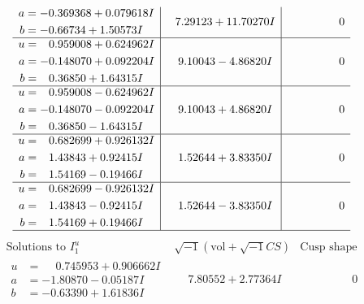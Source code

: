 \documentclass[1p]{elsarticle_modified}
\theoremstyle{definition}
\newcommand{\I}{\sqrt{-1}}
\begin{document}
$$\begin{array}{c|c|c}
\begin{aligned}
a &= -0.369368 + 0.079618 I \\
b &= -0.66734 + 1.50573 I\end{aligned}
 & \phantom{-}7.29123 + 11.70270 I & \phantom{-0.000000 } 0 \\ \hline\begin{aligned}
u &= \phantom{-}0.959008 + 0.624962 I \\
a &= -0.148070 + 0.092204 I \\
b &= \phantom{-}0.36850 + 1.64315 I\end{aligned}
 & \phantom{-}9.10043 - 4.86820 I & \phantom{-0.000000 } 0 \\ \hline\begin{aligned}
u &= \phantom{-}0.959008 - 0.624962 I \\
a &= -0.148070 - 0.092204 I \\
b &= \phantom{-}0.36850 - 1.64315 I\end{aligned}
 & \phantom{-}9.10043 + 4.86820 I & \phantom{-0.000000 } 0 \\ \hline\begin{aligned}
u &= \phantom{-}0.682699 + 0.926132 I \\
a &= \phantom{-}1.43843 + 0.92415 I \\
b &= \phantom{-}1.54169 - 0.19466 I\end{aligned}
 & \phantom{-}1.52644 + 3.83350 I & \phantom{-0.000000 } 0 \\ \hline\begin{aligned}
u &= \phantom{-}0.682699 - 0.926132 I \\
a &= \phantom{-}1.43843 - 0.92415 I \\
b &= \phantom{-}1.54169 + 0.19466 I\end{aligned}
 & \phantom{-}1.52644 - 3.83350 I & \phantom{-0.000000 } 0\\
 \hline 
 \end{array}$$\newpage$$\begin{array}{c|c|c}  
\text{Solutions to }I^u_{1}& \I (\text{vol} + \sqrt{-1}CS) & \text{Cusp shape}\\
 \hline 
\begin{aligned}
u &= \phantom{-}0.745953 + 0.906662 I \\
a &= -1.80870 - 0.05187 I \\
b &= -0.63390 + 1.61836 I\end{aligned}
 & \phantom{-}7.80552 + 2.77364 I & \phantom{-0.000000 } 0 \\ \hline\begin{aligned}

\end{aligned}
\end{array}$$
\end{document}
